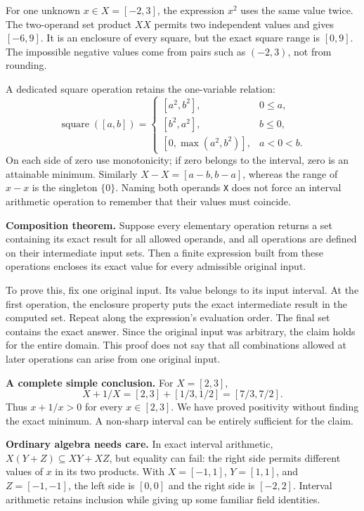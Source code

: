 \newpage
{}
For one unknown $x\in X=[-2,3]$, the expression $x^2$ uses the same value twice.
The two-operand set product $XX$ permits two independent values and gives
$[-6,9]$. It is an enclosure of every square, but the exact square range is $[0,9]$.
The impossible negative values come from pairs such as $(-2,3)$, not from rounding.

A dedicated square operation retains the one-variable relation:
\[
 \operatorname{square}([a,b])=
 \begin{cases}
 [a^2,b^2], & 0\le a,\\
 [b^2,a^2], & b\le0,\\
 [0,\max(a^2,b^2)], & a<0<b.
 \end{cases}
\]
On each side of zero use monotonicity; if zero belongs to the interval, zero is
an attainable minimum. Similarly $X-X=[a-b,b-a]$, whereas the range of $x-x$
is the singleton $\{0\}$. Naming both operands \texttt{X} does not force an interval
arithmetic operation to remember that their values must coincide.

\textbf{Composition theorem.} Suppose every elementary operation returns a set
containing its exact result for all allowed operands, and all operations are
defined on their intermediate input sets. Then a finite expression built from
these operations encloses its exact value for every admissible original input.

To prove this, fix one original input. Its value belongs to its input interval.
At the first operation, the enclosure property puts the exact intermediate result
in the computed set. Repeat along the expression's evaluation order. The final
set contains the exact answer. Since the original input was arbitrary, the claim
holds for the entire domain. This proof does not say that all combinations allowed
at later operations can arise from one original input.

\textbf{A complete simple conclusion.} For $X=[2,3]$,
\[
 X+1/X=[2,3]+[1/3,1/2]=[7/3,7/2].
\]
Thus $x+1/x>0$ for every $x\in[2,3]$. We have proved positivity without finding
the exact minimum. A non-sharp interval can be entirely sufficient for the claim.

\textbf{Ordinary algebra needs care.} In exact interval arithmetic,
$X(Y+Z)\subseteq XY+XZ$, but equality can fail: the right side permits different
values of $x$ in its two products. With $X=[-1,1]$, $Y=[1,1]$, and $Z=[-1,-1]$,
the left side is $[0,0]$ and the right side is $[-2,2]$. Interval arithmetic
retains inclusion while giving up some familiar field identities.

